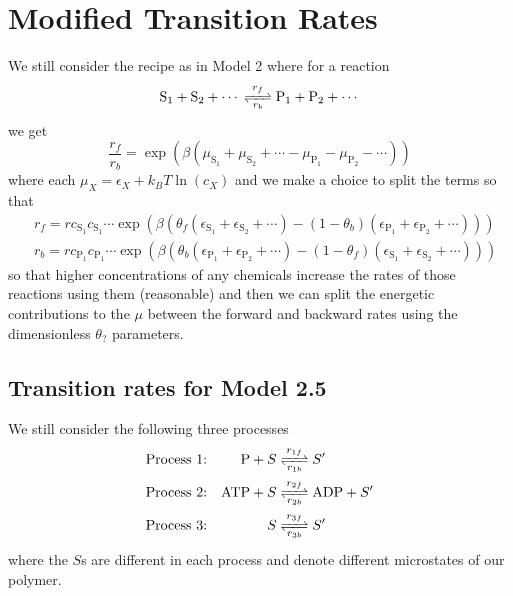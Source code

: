 \documentclass[11pt]{article}
\begin{document}
\section{Modified Transition Rates}
We still consider the recipe as in Model 2 where for a reaction
\begin{equation}
	\ce{S_1 + S_2 + $\cdots$ <=>[$r_f$][$r_b$] P_1 + P_2 + $\cdots$}
\end{equation}
we get
\begin{equation}
	\frac{r_f}{r_b} = \exp(\beta(\mu_{\text{S}_1} + \mu_{\text{S}_2} + \cdots - \mu_{\text{P}_1} - \mu_{\text{P}_2} - \cdots))
\end{equation}
where each $\mu_X = \epsilon_X + \si{k_B}T\ln(c_X)$ and we make a choice to split the terms so that
\begin{align}
	 & r_f = r c_{\text{S}_1}c_{\text{S}_1}\cdots \exp(\beta(\theta_f(\epsilon_{\text{S}_1} + \epsilon_{\text{S}_2} + \cdots) - (1-\theta_b)(\epsilon_{\text{P}_1} + \epsilon_{\text{P}_2} + \cdots))) \\
	 & r_b = r c_{\text{P}_1}c_{\text{P}_1}\cdots \exp(\beta(\theta_b(\epsilon_{\text{P}_1} + \epsilon_{\text{P}_2} + \cdots) - (1-\theta_f)(\epsilon_{\text{S}_1} + \epsilon_{\text{S}_2} + \cdots)))
\end{align}
so that higher concentrations of any chemicals increase the rates of those reactions using them (reasonable) and then we can split the energetic contributions to the $\mu$ between the forward and backward rates using the dimensionless $\theta_?$ parameters.

\subsection{Transition rates for Model 2.5}
We still consider the following three processes
\begin{align}
	\text{Process 1:} &  & \ce{P + $S$   & <=>[$r_{1f}$][$r_{1b}$] $S'$}       \\
	\text{Process 2:} &  & \ce{ATP + $S$ & <=>[$r_{2f}$][$r_{2b}$] ADP + $S'$} \\
	\text{Process 3:} &  & \ce{$S$       & <=>[$r_{3f}$][$r_{3b}$] $S'$}
\end{align}
where the $S$s are different in each process and denote different microstates of our polymer.
\end{document}
